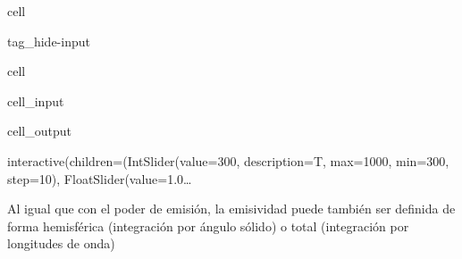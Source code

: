 \documentclass[letterpaper,10pt,english]{jupyterBook}
\begin{document}
\begin{sphinxuseclass}{cell}
\begin{sphinxuseclass}{tag_hide-input}
\end{sphinxuseclass}
\end{sphinxuseclass}
\begin{sphinxuseclass}{cell}\begin{sphinxVerbatimInput}

\begin{sphinxuseclass}{cell_input}
\begin{sphinxVerbatim}[commandchars=\\\{\}]
    

   
   
     
\end{sphinxVerbatim}

\end{sphinxuseclass}\end{sphinxVerbatimInput}
\begin{sphinxVerbatimOutput}

\begin{sphinxuseclass}{cell_output}
\begin{sphinxVerbatim}[commandchars=\\\{\}]
interactive(children=(IntSlider(value=300, description=\PYGZsq{}T\PYGZsq{}, max=1000, min=300, step=10), FloatSlider(value=1.0…
\end{sphinxVerbatim}

\end{sphinxuseclass}\end{sphinxVerbatimOutput}

\end{sphinxuseclass}
\sphinxAtStartPar
Al igual que con el poder de emisión, la emisividad puede también ser definida de forma hemisférica (integración por ángulo sólido) o total (integración por longitudes de onda)
\end{document}
